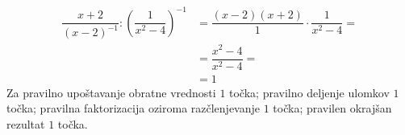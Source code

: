 \documentclass[addpoints,12pt]{exam}
\begin{document}
\begin{questions}
        \begin{solution}[11cm]
            \begin{align*}
                \dfrac{x+2}{(x-2)^{-1}}:\left(\dfrac{1}{x^2-4}\right)^{-1}&= \dfrac{(x-2)(x+2)}{1}\cdot\dfrac{1}{x^2-4}= \\
                                                                            &= \dfrac{x^2-4}{x^2-4}= \\
                                                                            &= 1
            \end{align*}
            Za pravilno upoštavanje obratne vrednosti $1$ točka; pravilno deljenje ulomkov $1$ točka; pravilna faktorizacija oziroma razčlenjevanje $1$ točka; pravilen okrajšan rezultat $1$ točka.
        \end{solution}











\end{questions}
\end{document}
